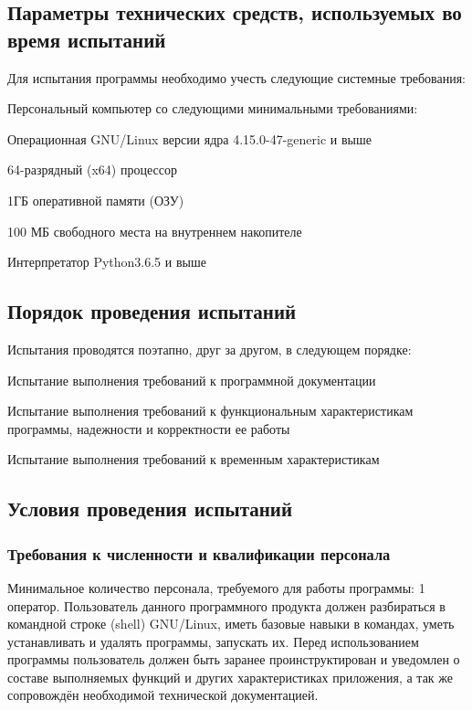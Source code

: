 \subsection{Параметры технических средств, используемых во время испытаний}
Для испытания программы необходимо учесть следующие системные требования:
\begin{my_enumerate}
    \item Персональный компьютер со следующими минимальными требованиями:
        \begin{my_enumerate}
            \item Операционная GNU/Linux версии ядра 4.15.0-47-generic и выше
            \item 64-разрядный (x64) процессор
            \item 1ГБ оперативной памяти (ОЗУ)
            \item 100 МБ свободного места на внутреннем накопителе
        \end{my_enumerate}
    \item Интерпретатор Python3.6.5 и выше
\end{my_enumerate}


\subsection{Порядок проведения испытаний}
Испытания проводятся поэтапно, друг за другом, в следующем порядке:
\begin{my_enumerate}
    \item Испытание выполнения требований к программной документации
    \item Испытание выполнения требований к функциональным характеристикам программы, надежности и корректности ее работы
    \item Испытание выполнения требований к временным характеристикам
\end{my_enumerate}


\subsection{Условия проведения испытаний}

\subsubsection{Требования к численности и квалификации персонала}
Минимальное количество персонала, требуемого для работы программы: 1 оператор.
Пользователь данного программного продукта должен разбираться в командной
строке (shell) GNU/Linux, иметь базовые навыки в командах, уметь устанавливать
и удалять программы, запускать их. Перед использованием программы
пользователь должен быть заранее проинструктирован и уведомлен о составе
выполняемых функций и других характеристиках приложения, а так же сопровождён
необходимой технической документацией.


